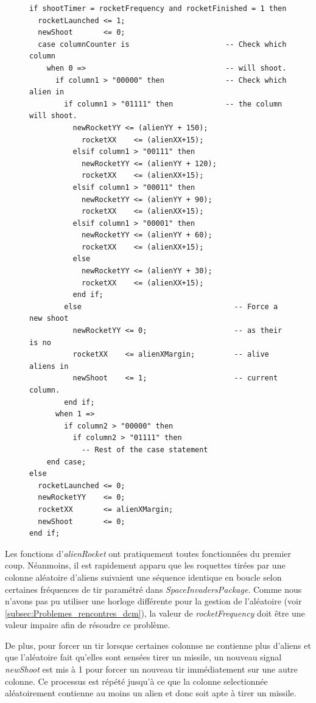 \documentclass[french]{nakrule}
\begin{document}
\begin{figure}
\begin{lstlisting}[style=vhdl, caption=Tir de rockets]
if shootTimer = rocketFrequency and rocketFinished = 1 then
  rocketLaunched <= 1;
  newShoot       <= 0;
  case columnCounter is                      -- Check which column
    when 0 =>                                -- will shoot.
      if column1 > "00000" then              -- Check which alien in
        if column1 > "01111" then            -- the column will shoot.
          newRocketYY <= (alienYY + 150);
            rocketXX    <= (alienXX+15);
          elsif column1 > "00111" then
            newRocketYY <= (alienYY + 120);
            rocketXX    <= (alienXX+15);
          elsif column1 > "00011" then
            newRocketYY <= (alienYY + 90);
            rocketXX    <= (alienXX+15);
          elsif column1 > "00001" then
            newRocketYY <= (alienYY + 60);
            rocketXX    <= (alienXX+15);
          else
            newRocketYY <= (alienYY + 30);
            rocketXX    <= (alienXX+15);
          end if;
        else                                   -- Force a new shoot
          newRocketYY <= 0;                    -- as their is no
          rocketXX    <= alienXMargin;         -- alive aliens in
          newShoot    <= 1;                    -- current column.
        end if;
      when 1 =>
        if column2 > "00000" then
          if column2 > "01111" then
            -- Rest of the case statement
    end case;
else
  rocketLaunched <= 0;
  newRocketYY    <= 0;
  rocketXX       <= alienXMargin;
  newShoot       <= 0;
end if;
\end{lstlisting}
\end{figure}
Les fonctions d'\emph{alienRocket} ont pratiquement toutes fonctionnées du
premier coup. Néanmoins, il est rapidement apparu que les roquettes tirées par
une colonne aléatoire d'aliens suivaient une séquence identique en boucle selon
certaines fréquences de tir paramétré dans \emph{SpaceInvadersPackage}. Comme
nous n'avons pas pu utiliser une horloge différente pour la gestion de
l'aléatoire (voir \ref{subsec:Problemes_rencontres_dcm}), la valeur de
\emph{rocketFrequency} doit être une valeur impaire afin de résoudre ce
problème.

De plus, pour forcer un tir lorsque certaines colonnse ne contienne plus d'aliens
et que l'aléatoire fait qu'elles sont sensées tirer un missile, un nouveau
signal \emph{newShoot} est mis à 1 pour forcer un nouveau tir immédiatement sur
une autre colonne. Ce processus est répété jusqu'à ce que la colonne
selectionnée aléatoirement contienne au moins un alien et donc soit apte à tirer
un missile.
\end{document}
